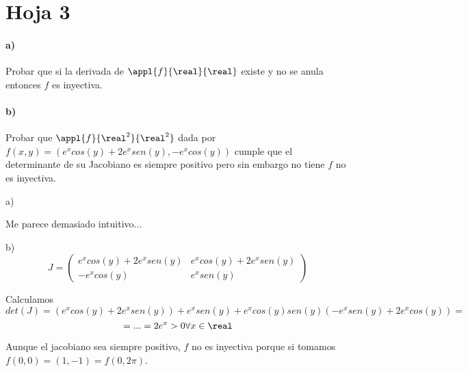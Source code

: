 \section{Hoja 3}
\begin{problem}[3]
\paragraph{a)} Probar que si la derivada de $\appl{f}{\real}{\real}$ existe y no se anula entonces $f$ es inyectiva.
\paragraph{b)} Probar que $\appl{f}{\real^2}{\real^2}$ dada por $f(x,y) =( e^xcos(y) + 2e^xsen(y),-e^xcos(y))$ cumple que el determinante de su Jacobiano es siempre positivo pero sin embargo no tiene $f$ no es inyectiva.

\solution

a)

Me parece demasiado intuitivo...

b)
$$J = \begin{pmatrix}
       e^xcos(y)+2e^xsen(y) & e^xcos(y)+2e^xsen(y) \\
       -e^xcos(y) & e^xsen(y)
      \end{pmatrix}
$$

Calculamos $$det(J) = (e^xcos(y)+2e^xsen(y))+e^xsen(y) + e^xcos(y)sen(y)(-e^xsen(y)+2e^xcos(y)) = $$
$$ = ... = 2e^x > 0 \forall x \in \real$$

Aunque el jacobiano sea siempre positivo, $f$ no es inyectiva porque si tomamos $f(0,0) = (1,-1) = f(0,2\pi)$.
\end{problem}
